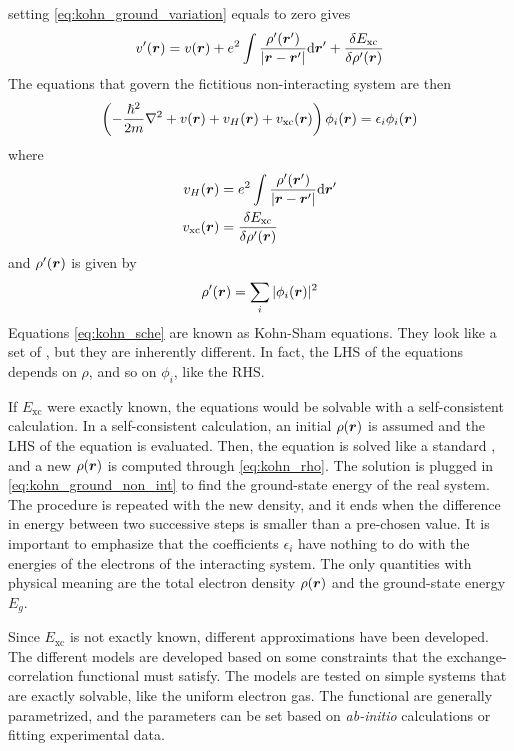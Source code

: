 setting \cref{eq:kohn_ground_variation} equals to zero gives
\begin{equation}
    \rr{v'} = \rr{v} + e^2 \int \frac{\rho'(\vec{r}')}{|\vec{r}-\vec{r}'|} \dr' + \frac{\delta E_\text{xc}}{\delta\rr{\rho'}}
\end{equation}
The equations that govern the fictitious non-interacting system are then
\begin{equation} \label{eq:kohn_sche}
    \left(-\frac{\hslash^2}{2m} \laplacian + \rr{v} + \rr{v_H} + \rr{v_\text{xc}} \right) \rr{\phi_i} = \epsilon_i \rr{\phi_i}
\end{equation}
where
\begin{align}
    \rr{v_H}         & = e^2 \int \frac{\rho'(\vec{r}')}{|\vec{r}-\vec{r}'|} \dr' \\
    \rr{v_\text{xc}} & =  \frac{\delta E_\text{xc}}{\delta\rr{\rho'}}
\end{align}
and $\rho'(\mathbf{\boldsymbol{r}})$ is given by
\begin{equation} \label{eq:kohn_rho}
    \rho'(\mathbf{\boldsymbol{r}}) = \sum_i |\phi_i(\mathbf{\boldsymbol{r}})|^2
\end{equation}
Equations \ref{eq:kohn_sche} are known as Kohn-Sham equations. They look like a set of \sches, but they are inherently different. In fact, the LHS of the equations depends on $\rho$, and so on $\phi_i$, like the RHS.

If $E_\text{xc}$ were exactly known, the equations would be solvable with a self-consistent calculation. In a self-consistent calculation, an initial $\rho(\mathbf{\boldsymbol{r}})$ is assumed and the LHS of the equation is evaluated. Then, the equation is solved like a standard \sche, and a new $\rho(\mathbf{\boldsymbol{r}})$ is computed through \cref{eq:kohn_rho}. The solution is plugged in \cref{eq:kohn_ground_non_int} to find the ground-state energy of the real system. The procedure is repeated with the new density, and it ends when the difference in energy between two successive steps is smaller than a pre-chosen value. It is important to emphasize that the coefficients $\epsilon_i$ have nothing to do with the energies of the electrons of the interacting system. The only quantities with physical meaning are the total electron density $\rho(\mathbf{\boldsymbol{r}})$ and the ground-state energy $E_g$.

Since $E_\text{xc}$ is not exactly known, different approximations have been developed. The different models are developed based on some constraints that the exchange-correlation functional must satisfy. The models are tested on simple systems that are exactly solvable, like the uniform electron gas. The functional are generally parametrized, and the parameters can be set based on \emph{ab-initio} calculations or fitting experimental data.

